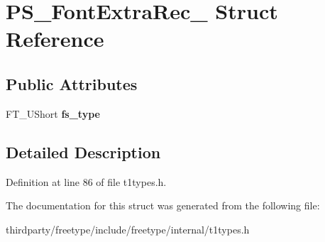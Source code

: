 \hypertarget{struct_p_s___font_extra_rec__}{}\section{P\+S\+\_\+\+Font\+Extra\+Rec\+\_\+ Struct Reference}
\label{struct_p_s___font_extra_rec__}
\subsection*{Public Attributes}
\begin{DoxyCompactItemize}
\item 
\mbox{\label{struct_p_s___font_extra_rec___a048e1e57ee974c3e05e9a88476e6b8a9}} 
F\+T\+\_\+\+U\+Short {\bfseries fs\+\_\+type}
\end{DoxyCompactItemize}


\subsection{Detailed Description}


Definition at line 86 of file t1types.\+h.



The documentation for this struct was generated from the following file\+:\begin{DoxyCompactItemize}
\item 
thirdparty/freetype/include/freetype/internal/t1types.\+h\end{DoxyCompactItemize}
